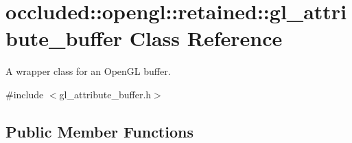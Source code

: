 \hypertarget{classoccluded_1_1opengl_1_1retained_1_1gl__attribute__buffer}{\section{occluded\+:\+:opengl\+:\+:retained\+:\+:gl\+\_\+attribute\+\_\+buffer Class Reference}
\label{classoccluded_1_1opengl_1_1retained_1_1gl__attribute__buffer}
}


A wrapper class for an Open\+G\+L buffer.  




{\ttfamily \#include $<$gl\+\_\+attribute\+\_\+buffer.\+h$>$}

\subsection*{Public Member Functions}
